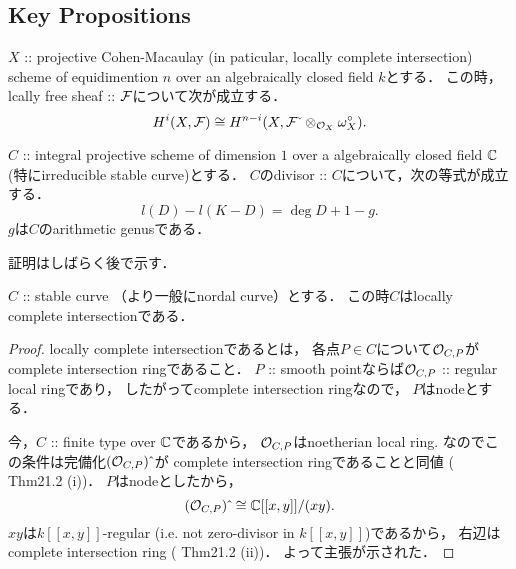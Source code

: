 \documentclass[a4paper]{jsarticle}
\begin{document}
    \subsection{Key Propositions}
    \begin{Thm} \label{thm:Hi_iso_Hn-i}
        $X$ :: projective Cohen-Macaulay (in paticular, locally complete intersection)
        scheme of equidimention $n$
        over an algebraically closed field $k$とする．
        この時，lcally free sheaf :: $\mathcal{F}$について次が成立する．
        \[ H^i(X, \mathcal{F}) \cong H^{n-i}(X, \mathcal{F} \,\check{}\, \otimes_{\mathcal{O}_X} \omega^{\circ}_X). \]
    \end{Thm}

    \begin{Thm} \label{thm:RRforSingCurve}
        $C$ :: integral projective scheme of dimension $1$
        over a algebraically closed field $\mathbb{C}$
        (特にirreducible stable curve)とする．
        $C$のdivisor :: $C$について，次の等式が成立する．
        \[ l(D)-l(K-D)=\deg D+1-g. \]
        $g$は$C$のarithmetic genusである．
    \end{Thm}
    証明はしばらく後で示す．

    \begin{Lemma}
        $C$ :: stable curve （より一般にnordal curve）とする．
        この時$C$はlocally complete intersectionである．
    \end{Lemma}
    \begin{proof}
        locally complete intersectionであるとは，
        各点$P \in C$について$\mathcal{O}_{C, P}$がcomplete intersection ringであること．
        $P$ :: smooth pointならば$\mathcal{O}_{C, P}$ :: regular local ringであり，
        したがってcomplete intersection ringなので，
        $P$はnodeとする．

        今，$C$ :: finite type over $\mathbb{C}$であるから，
        $\mathcal{O}_{C, P}$はnoetherian local ring.
        なのでこの条件は完備化$(\mathcal{O}_{C, P})\,\hat{}\,$が
        complete intersection ringであることと同値
        (\cite{Mat} Thm21.2 (i))．
        $P$はnodeとしたから，
        \[ (\mathcal{O}_{C, P})\,\hat{}\, \cong \mathbb{C}[[x,y]]/(xy). \]
        $xy$は$k[[x,y]]$-regular (i.e. not zero-divisor in $k[[x,y]]$)であるから，
        右辺はcomplete intersection ring (\cite{Mat} Thm21.2 (ii))．
        よって主張が示された．
    \end{proof}
\end{document}

